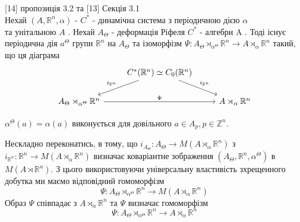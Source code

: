 \begin{proposition}{[14] пропозиція 3.2 та [13] Секція 3.1} \\

    Нехай $(A, \mathbb{R}^n, \alpha)$ - $C^*$ - динамічна система з періодичною
    дією $\alpha$ \\ та унітальною $A$ .
    Нехай $A_\Theta$ - деформація Ріфеля $C^*$ - алгебри A .
    Тоді існує періодична дія $a^\Theta$ групи $\mathbb{R}^n$ на $A_\Theta$ та
    ізоморфізм $\Psi: A_\Theta \rtimes_{\alpha^\Theta} \mathbb{R}^n \to A \rtimes_\alpha \mathbb{R}^n$
    такий, що ця діаграма
    \begin{equation*}
        \begin{tikzcd}
            & C^*(\mathbb{R}^n) \simeq C_0(\mathbb{R}^n) \arrow[ld, "i_{\mathbb{R}^n}"'] \arrow[rd, "i_{\mathbb{R}^n}"] &\\
            A_\Theta \rtimes_{\alpha^\Theta} \mathbb{R}^n \arrow[rr, "\Psi"] & & A \rtimes_\alpha \mathbb{R}^n
        \end{tikzcd}
    \end{equation*}

    $\alpha^\Theta(a) = \alpha(a)$ виконується для довільного $a \in A_p, p \in \mathbb{Z}^n$.

    Нескладно переконатись, в тому, що $i_{A_\Theta}: A_\Theta \to M(A \rtimes_\alpha \mathbb{R}^n)$ з $i_{\mathbb{R}^n}: \mathbb{R}^n \to M(A \rtimes_\alpha \mathbb{R}^n)$
    визначає коваріантне зображення $(A_\Theta, \mathbb{R}^n, \alpha^\Theta)$ в $M(A \rtimes \mathbb{R}^n)$.
    З цього використовуючи універсальну властивість зхрещенного добутка ми маємо відповідний гомоморфізм
    \begin{equation*}
        \Psi: A_\Theta \rtimes_{\alpha^\Theta} \mathbb{R}^n \to M(A \rtimes_\alpha \mathbb{R}^n)
    \end{equation*}
    Образ $\Psi$ співпадає з $A \rtimes_\alpha \mathbb{R}^n$ та $\Psi$ визначає гомоморфізм
    \begin{equation*}
        \Psi: A_\Theta \rtimes_{\alpha^\Theta} \mathbb{R}^n \to A \rtimes_\alpha \mathbb{R}^n
    \end{equation*}
\end{proposition}

